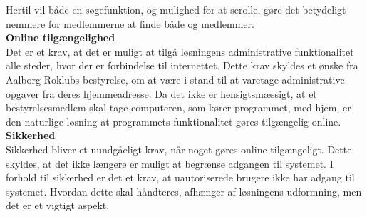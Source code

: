Hertil vil både en søgefunktion, og mulighed for at scrolle, gøre det betydeligt nemmere for medlemmerne at finde både og medlemmer.\\

\textbf{Online tilgængelighed}\\
Det er et krav, at det er muligt at tilgå løsningens administrative funktionalitet alle steder, hvor der er forbindelse til internettet. Dette krav skyldes et ønske fra Aalborg Roklubs bestyrelse, om at være i stand til at varetage administrative opgaver fra deres hjemmeadresse. Da det ikke er hensigtsmæssigt, at et bestyrelsesmedlem skal tage computeren, som kører programmet, med hjem, er den naturlige løsning at programmets funktionalitet gøres tilgængelig online.\\

\textbf{Sikkerhed}\\
Sikkerhed bliver et uundgåeligt krav, når noget gøres online tilgængeligt. Dette skyldes, at det ikke længere er muligt at begrænse adgangen til systemet. I forhold til sikkerhed er det et krav, at uautoriserede brugere ikke har adgang til systemet. Hvordan dette skal håndteres, afhænger af løsningens udformning, men det er et vigtigt aspekt.